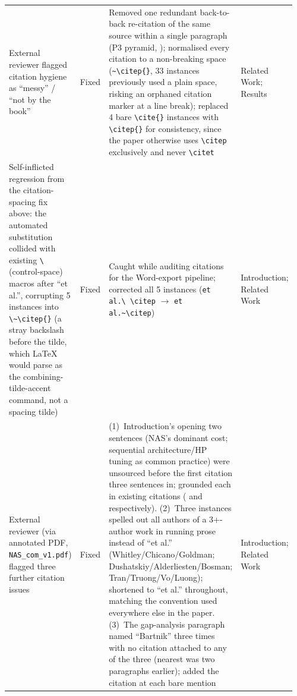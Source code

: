 \begin{longtable}{p{0.24\linewidth} p{0.08\linewidth} p{0.55\linewidth} p{0.09\linewidth}}
External reviewer flagged citation hygiene as ``messy'' / ``not by the book'' & Fixed & Removed one redundant back-to-back re-citation of the same source within a single paragraph (P3 pyramid, \citep{goldman2014parameterless}); normalised every citation to a non-breaking space (\texttt{\textasciitilde\textbackslash citep\{\}}, 33 instances previously used a plain space, risking an orphaned citation marker at a line break); replaced 4 bare \texttt{\textbackslash cite\{\}} instances with \texttt{\textbackslash citep\{\}} for consistency, since the paper otherwise uses \texttt{\textbackslash citep} exclusively and never \texttt{\textbackslash citet} & Related Work; Results \\
Self-inflicted regression from the citation-spacing fix above: the automated substitution collided with existing \texttt{\textbackslash\ } (control-space) macros after ``et al.'', corrupting 5 instances into \texttt{\textbackslash\textasciitilde\textbackslash citep\{\}} (a stray backslash before the tilde, which LaTeX would parse as the combining-tilde-accent command, not a spacing tilde) & Fixed & Caught while auditing citations for the Word-export pipeline; corrected all 5 instances (\texttt{et al.\textbackslash\ \textbackslash citep} $\rightarrow$ \texttt{et al.\textasciitilde\textbackslash citep}) & Introduction; Related Work \\
External reviewer (via annotated PDF, \texttt{NAS\_com\_v1.pdf}) flagged three further citation issues & Fixed & (1)~Introduction's opening two sentences (NAS's dominant cost; sequential architecture/HP tuning as common practice) were unsourced before the first citation three sentences in; grounded each in existing citations (\citep{white2023insights,liu2023survey} and \citep{lu2019nsganet,lu2020nsganetv2} respectively). (2)~Three instances spelled out all authors of a 3+-author work in running prose instead of ``et al.'' (Whitley/Chicano/Goldman; Dushatskiy/Alderliesten/Bosman; Tran/Truong/Vo/Luong); shortened to ``et al.'' throughout, matching the convention used everywhere else in the paper. (3)~The gap-analysis paragraph named ``Bartnik'' three times with no citation attached to any of the three (nearest \citep{bartnik2026evolutionary} was two paragraphs earlier); added the citation at each bare mention & Introduction; Related Work \\

\end{longtable}

